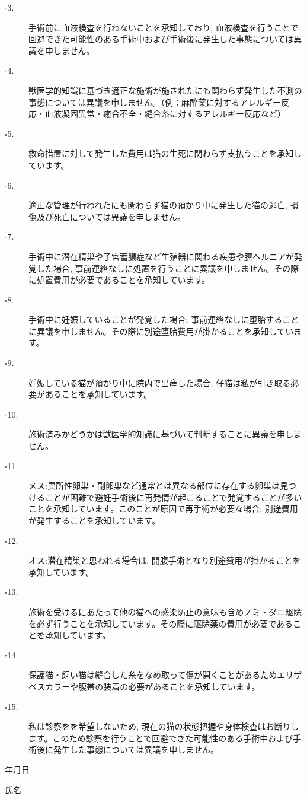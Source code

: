 \documentclass{jsarticle}
\begin{document}
\begin{description}
  \item[$\square$3.] 手術前に血液検査を行わないことを承知しており, 血液検査を行うことで回避できた可能性のある手術中および手術後に発生した事態については異議を申しません。
  \item[$\square$4.] 獣医学的知識に基づき適正な施術が施されたにも関わらず発生した不測の事態については異議を申しません。（例：麻酔薬に対するアレルギー反応・血液凝固異常・癒合不全・縫合糸に対するアレルギー反応など）
  \item[$\square$5.] 救命措置に対して発生した費用は猫の生死に関わらず支払うことを承知しています。
  \item[$\square$6.] 適正な管理が行われたにも関わらず猫の預かり中に発生した猫の逃亡, 損傷及び死亡については異議を申しません。
  \item[$\square$7.] 手術中に潜在精巣や子宮蓄膿症など生殖器に関わる疾患や臍ヘルニアが発覚した場合, 事前連絡なしに処置を行うことに異議を申しません。その際に処置費用が必要であることを承知しています。
  \item[$\square$8.] 手術中に妊娠していることが発覚した場合, 事前連絡なしに堕胎することに異議を申しません。その際に別途堕胎費用が掛かることを承知しています。
  \item[$\square$9.]\hspace{-5pt}妊娠している猫が預かり中に院内で出産した場合, 仔猫は私が引き取る必要があることを承知しています。
  \item[$\square$10.]\hspace{-5pt}施術済みかどうかは獣医学的知識に基づいて判断することに異議を申しません。
  \item[$\square$11.]\hspace{-5pt}メス:異所性卵巣・副卵巣など通常とは異なる部位に存在する卵巣は見つけることが困難で避妊手術後に再発情が起こることで発覚することが多いことを承知しています。このことが原因で再手術が必要な場合, 別途費用が発生することを承知しています。
  \item[$\square$12.]\hspace{-5pt}オス:潜在精巣と思われる場合は, 開腹手術となり別途費用が掛かることを承知しています。
  \item[$\square$13.]\hspace{-5pt}施術を受けるにあたって他の猫への感染防止の意味も含めノミ・ダニ駆除を必ず行うことを承知しています。その際に駆除薬の費用が必要であることを承知しています。
  \item[$\square$14.]\hspace{-5pt}保護猫・飼い猫は縫合した糸をなめ取って傷が開くことがあるためエリザベスカラーや腹帯の装着の必要があることを承知しています。
  \item[$\square$15.]\hspace{-5pt}私は診察をを希望しないため, 現在の猫の状態把握や身体検査はお断りします。このため診察を行うことで回避できた可能性のある手術中および手術後に発生した事態については異議を申しません。
\end{description}


\begin{flushright}
年\hspace{40pt}月\hspace{40pt}日

\vspace{20pt}
氏名\underline{\hspace{205pt}}
\end{flushright}
\end{document}
